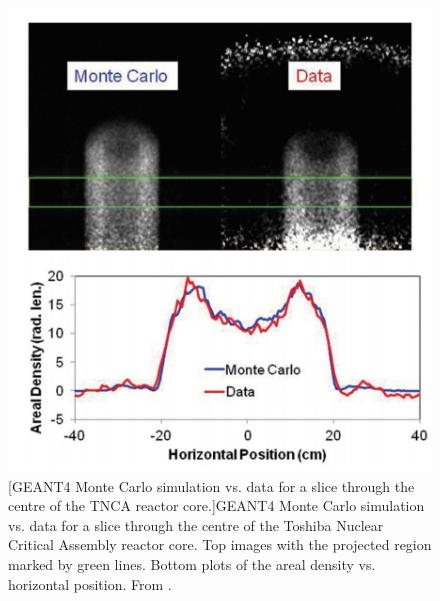 \begin{figure}[!h]
\begin{minipage}{.45\textwidth}
  \includegraphics[width=\linewidth]{Chapter5/Figs/MuTomographyExamples/toshibaG4Compare.jpg}
  [GEANT4 Monte Carlo simulation vs. data for a slice through the centre of the TNCA reactor core.]{GEANT4 Monte Carlo simulation vs. data for a slice through the centre of the Toshiba Nuclear Critical Assembly reactor core. Top images with the projected region marked by green lines. Bottom plots of the areal density vs. horizontal position. From \cite{morris2014analysis}.}
  \label{fig:toshibaG4Compare}
\end{minipage}
\end{figure}


